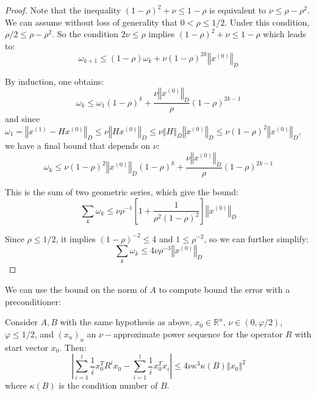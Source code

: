 \begin{proof}
Note that the inequality $\left(1-\rho\right)^{2}+\nu\leq1-\rho$
is equivalent to $\nu\leq\rho-\rho^{2}$. We can assume without loss
of generality that $0<\rho\leq1/2$. Under this condition, $\rho/2\leq\rho-\rho^{2}$.
So the condition $2\nu\leq\rho$ implies $\left(1-\rho\right)^{2}+\nu\leq1-\rho$
which leads to: 
\[
\omega_{k+1}\leq\left(1-\rho\right)\omega_{k}+\nu\left(1-\rho\right)^{2k}\left\Vert x^{\left(0\right)}\right\Vert _{D}
\]


By induction, one obtains: 
\[
\omega_{k}\leq\omega_{1}\left(1-\rho\right)^{k}+\frac{\nu\left\Vert x^{\left(0\right)}\right\Vert _{D}}{\rho}\left(1-\rho\right)^{2k-1}
\]
and since $\omega_{1}=\left\Vert x^{\left(1\right)}-Hx^{\left(0\right)}\right\Vert _{D}\leq\nu\left\Vert Hx^{\left(0\right)}\right\Vert _{D}\leq\nu\left\Vert H\right\Vert _{D}\left\Vert x^{\left(0\right)}\right\Vert _{D}\leq\nu\left(1-\rho\right)^{2}\left\Vert x^{\left(0\right)}\right\Vert _{D}$,
we have a final bound that depends on $\nu$: 
\[
\omega_{k}\leq\nu\left(1-\rho\right)^{2}\left\Vert x^{\left(0\right)}\right\Vert _{D}\left(1-\rho\right)^{k}+\frac{\nu\left\Vert x^{\left(0\right)}\right\Vert _{D}}{\rho}\left(1-\rho\right)^{2k-1}
\]


This is the sum of two geometric series, which give the bound: 
\[
\sum_{k}\omega_{k}\leq\nu\rho^{-1}\left[1+\frac{1}{\rho^{2}\left(1-\rho\right)^{2}}\right]\left\Vert x^{\left(0\right)}\right\Vert _{D}
\]


Since $\rho\leq1/2$, it implies $\left(1-\rho\right)^{-2}\leq4$
and $1\leq\rho^{-2}$, so we can further simplify: 
\[
\sum_{k}\omega_{k}\leq4\nu\rho^{-3}\left\Vert x^{\left(0\right)}\right\Vert _{D}
\]


\end{proof}

We can use the bound on the norm of $A$ to compute bound the error
with a preconditioner:

\begin{lemma}\label{lem:partial-sequence-approximate}Consider $A,B$
with the same hypothesis as above, $x_{0}\in\mathbb{R}^{n}$, $\nu\in\left(0,\varphi/2\right)$,
$\varphi\leq1/2$, and $\left(x_{u}\right)_{u}$ an $\nu-$approximate
power sequence for the operator $R$ with start vector $x_{0}$. Then:
\[
\left|\sum_{i=1}^{l}\frac{1}{i}x_{0}^{T}R^{i}x_{0}-\sum_{i=1}^{l}\frac{1}{i}x_{0}^{T}x_{i}\right|\leq4\nu\kappa^{3}\kappa\left(B\right)\left\Vert x_{0}\right\Vert ^{2}
\]
 where $\kappa\left(B\right)$ is the condition number of $B$.

\end{lemma}

